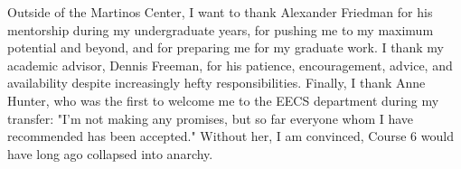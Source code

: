 Outside of the Martinos Center, I want to thank Alexander Friedman for his mentorship during my undergraduate years, for pushing me to my maximum potential and beyond, and for preparing me for my graduate work. I thank my academic advisor, Dennis Freeman, for his patience, encouragement, advice, and availability despite increasingly hefty responsibilities. Finally, I thank Anne Hunter, who was the first to welcome me to the EECS department during my transfer: "I'm not making any promises, but so far everyone whom I have recommended has been accepted." Without her, I am convinced, Course 6 would have long ago collapsed into anarchy. 

\cleardoublepage

\tableofcontents

\restoregeometry
